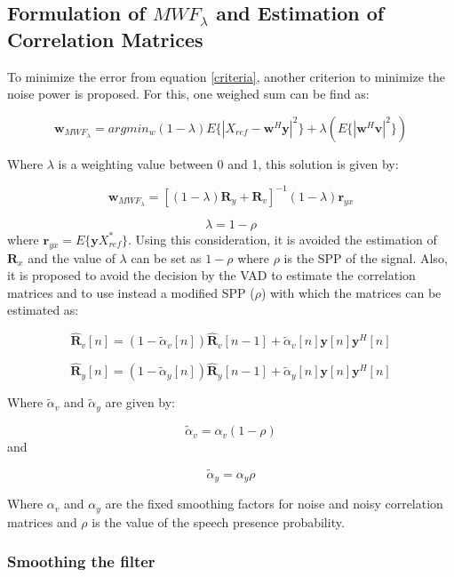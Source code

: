 \subsection{Formulation of {$MWF_\lambda$}  and Estimation of Correlation Matrices}

To minimize the error from equation \eqref{criteria}, another criterion to minimize the noise power is proposed. For this, one weighed sum can be find as:

$$\textbf{w}_{MWF_\lambda}=argmin_w(1-\lambda)E\{|X_{ref}-\textbf{w}^H\textbf{y}|^2\}+\lambda(E\{|\textbf{w}^H\textbf{v}|^2\})$$

Where $\lambda$ is a weighting value between 0 and 1, this solution is given by:

\begin{equation}
\textbf{w}_{MWF_\lambda}=[(1-\lambda)\textbf{R}_y+\textbf{R}_v]^{-1}(1-\lambda)\textbf{r}_{yx}
\label{mwfl}
\end{equation}


$$\lambda=1-\rho$$
where $\textbf{r}_{yx}=E\{\textbf{y}X^*_{ref}\}$.   Using this consideration, it is avoided the estimation of $\textbf{R}_x$ and the value of $\lambda$ can be set as $1-\rho$ where $\rho$ is the SPP of the signal. Also,  it is proposed to avoid the decision by the VAD to estimate the correlation matrices and to use instead a modified SPP ($\rho$) with which the matrices can be estimated as:




\begin{equation}
\hat{\textbf{R}}_v[n]=(1-\tilde{\alpha}_v[n])\hat{\textbf{R}}_v[n-1]+\tilde{\alpha}_v[n]\textbf{y}[n]\textbf{y}^H[n] 
\label{corrv}
\end{equation}

\begin{equation}
\hat{\textbf{R}}_y[n]=(1-\tilde{\alpha}_y[n])\hat{\textbf{R}}_y[n-1]+\tilde{\alpha}_y[n]\textbf{y}[n]\textbf{y}^H[n]
\label{corry}
\end{equation}


Where $\tilde{\alpha}_v$ and $\tilde{\alpha}_y$  are given by:

$$\tilde{\alpha}_v=\alpha_v(1-\rho)$$ and

$$\tilde{\alpha}_y=\alpha_y\rho$$

Where $\alpha_v$ and $\alpha_y$ are the fixed smoothing factors for noise and noisy correlation matrices and $\rho$ is the value of the speech presence probability. 


\subsubsection{Smoothing the filter}

